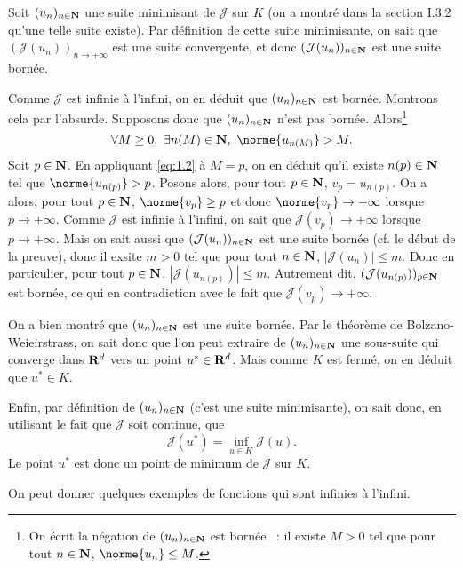 \documentclass[grape]{../ceri/sty/MasterNotes}
\newcommand\J{\mathcal J}
\begin{document}
\begin{demo}
    Soit $(u_n)_{n\in\mathbf{N}}$ une suite minimisant de $\J$ sur $K$ (on a montré dans la section I.3.2 qu'une telle suite existe). Par définition de cette suite minimisante, on sait que $(\J(u_n))_{n\to+\infty}$ est une suite convergente, et donc $(\J(u_n))_{n\in\N}$ est une suite bornée.

    Comme $\J$ est \og infinie à l'infini\fg, on en déduit que $(u_n)_{n\in\mathbf{N}}$ est bornée. Montrons cela par l'absurde. Supposons donc que $(u_n)_{n\in\mathbf{N}}$ n'est pas bornée. Alors\footnote{On écrit la négation de \og $(u_n)_{n\in\mathbf{N}}$ est bornée \fg\ : il existe $M>0$ tel que pour tout $n\in\mathbf{N}$, $\norme{u_n}\le M$.}
    \begin{equation}
        \forall M\ge 0,\ \exists n(M)\in\N,\ \norme{u_{n(M)}}> M.\label{eq:1.2}
    \end{equation}
    Soit $p\in\mathbf{N}$. En appliquant \eqref{eq:1.2} à $M=p$, on en déduit qu'il existe $n(p)\in\mathbf{N}$ tel que $\norme{u_{n(p)}}>p$. Posons alors, pour tout $p\in\mathbf{N}$, $v_p=u_{n(p)}$. On a alors, pour tout $p\in\mathbf{N}$, $\norme{v_p}\ge p$ et donc $\norme{v_p}\to +\infty$ lorsque $p\to+\infty$. Comme $\J$ est infinie à l'infini, on sait que $\J(v_p)\to+\infty$ lorsque $p\to+\infty$. Mais on sait aussi que $(\J(u_n))_{n\in\N}$ est une suite bornée (cf. le début de la preuve), donc il exsite $m>0$ tel que pour tout $n\in\mathbf{N}$, $|\J(u_n)|\le m$. Donc en particulier, pour tout $p\in\mathbf{N}$, $|\J(u_{n(p)})|\le m$. Autrement dit, $(\J(u_{n(p)}))_{p\in\N}$ est bornée, ce qui en contradiction avec le fait que $\J(v_p)\to+\infty$.

    On a bien montré que $(u_n)_{n\in\mathbf{N}}$ est une suite bornée. Par le théorème de Bolzano-Weieirstrass, on sait donc que l'on peut extraire de $(u_n)_{n\in\mathbf{N}}$ une sous-suite qui converge dans $\mathbf{R}^d$ vers un point $u^*\in\mathbf{R}^d$. Mais comme $K$ est fermé, on en déduit que $u^*\in K$.

    Enfin, par définition de $(u_n)_{n\in\mathbf{N}}$ (c'est une suite minimisante), on sait donc, en utilisant le fait que $\J$ soit continue, que
    \begin{equation*}
        \J(u^*)=\inf_{u\in K}\J(u).
    \end{equation*}
    Le point $u^*$ est donc un point de minimum de $\J$ sur $K$.
\end{demo}

On peut donner quelques exemples de fonctions qui sont \og infinies à l'infini\fg.
\end{document}
